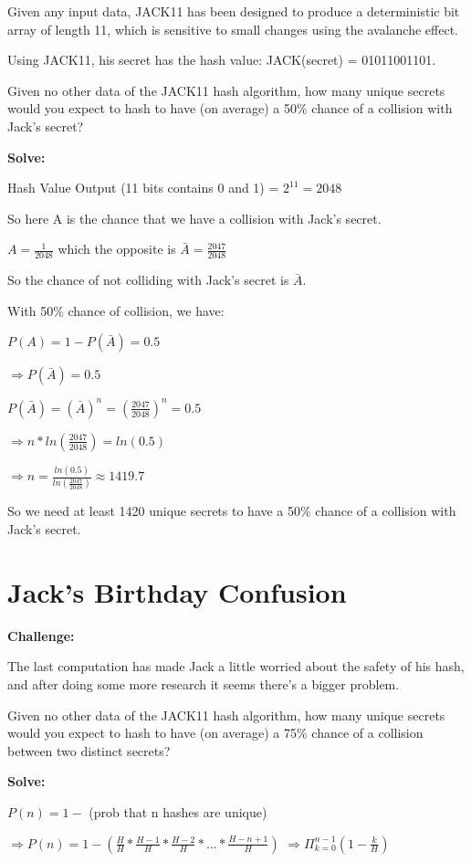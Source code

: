 \documentclass[12pt, a4paper, oneside]{report}
\begin{document}
Given any input data, JACK11 has been designed to produce a deterministic bit array of length 11, which is sensitive to small changes using the avalanche effect.

Using JACK11, his secret has the hash value: JACK(secret) = 01011001101.

Given no other data of the JACK11 hash algorithm, how many unique secrets would you expect to hash to have (on average) a 50\% chance of a collision with Jack's secret?

\textbf{Solve:}

Hash Value Output (11 bits contains 0 and 1) = $2^{11} = 2048$

So here A is the chance that we have a collision with Jack's secret.

$A = \frac{1}{2048}$ which the opposite is $\bar A = \frac{2047}{2048}$

So the chance of not colliding with Jack's secret is $\bar A$.

With 50\% chance of collision, we have:

$P(A) = 1 - P(\bar A) = 0.5$

$\Rightarrow P(\bar A) = 0.5$

$P(\bar A) = (\bar A)^n = (\frac{2047}{2048})^n = 0.5$

$\Rightarrow n * ln(\frac{2047}{2048}) = ln(0.5)$

$\Rightarrow n = \frac{ln(0.5)}{ln(\frac{2047}{2048})} \approx 1419.7$

So we need at least 1420 unique secrets to have a 50\% chance of a collision with Jack's secret.

\section{Jack's Birthday Confusion}
\textbf{Challenge:}

The last computation has made Jack a little worried about the safety of his hash, and after doing some more research it seems there's a bigger problem.

Given no other data of the JACK11 hash algorithm, how many unique secrets would you expect to hash to have (on average) a 75\% chance of a collision between two distinct secrets?

\textbf{Solve:}

$P(n) = 1 -$ (prob that n hashes are unique)

$\Rightarrow P(n) = 1 - (\frac{H}{H} * \frac{H-1}{H} * \frac{H-2}{H} * ... * \frac{H-n+1}{H})$
$\Rightarrow \Pi_{k = 0}^{n-1} (1 - \frac{k}{H})$
\end{document}
